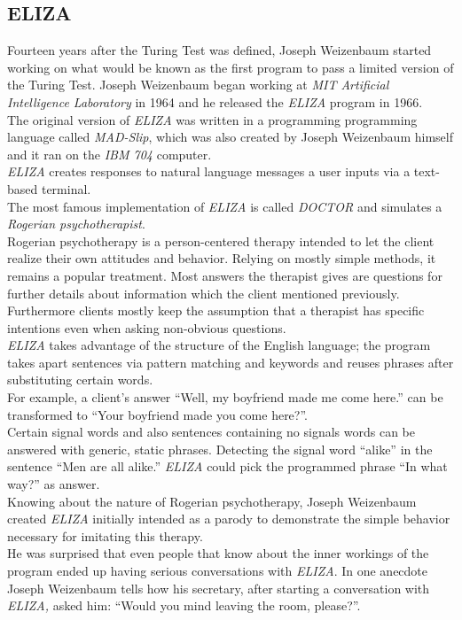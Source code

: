 \subsection{ELIZA}
\label{eliza}

Fourteen years after the Turing Test was defined, Joseph Weizenbaum started working on what would be known as the first program to pass a limited version of the Turing Test.
Joseph Weizenbaum began working at \emph{MIT Artificial Intelligence Laboratory} in 1964 and he released the \emph{ELIZA} program in 1966.
\\

The original version of \emph{ELIZA} was written in a programming programming language called \emph{MAD-Slip},
which was also created by Joseph Weizenbaum himself and it ran on the \emph{IBM 704} computer.
\\
\emph{ELIZA} creates responses to natural language messages a user inputs via a text-based terminal.
\\

The most famous implementation of \emph{ELIZA} is called \emph{DOCTOR} and simulates a \emph{Rogerian psychotherapist}.
\\
Rogerian psychotherapy is a person-centered therapy intended to let the client realize their own attitudes and behavior.
Relying on mostly simple methods, it remains a popular treatment.
Most answers the therapist gives are questions for further details about information which the client mentioned previously.
Furthermore clients mostly keep the assumption that a therapist has specific intentions even when asking non-obvious questions.
\\

\emph{ELIZA} takes advantage of the structure of the English language;
the program takes apart sentences via pattern matching and keywords and reuses phrases after substituting certain words.
\\
For example, a client's answer ``Well, my boyfriend made me come here.'' can be transformed to ``Your boyfriend made you come here?''\cite{elizatest}.
\\
Certain signal words and also sentences containing no signals words can be answered with generic, static phrases.
Detecting the signal word ``alike'' in the sentence ``Men are all alike.'' \emph{ELIZA} could pick the programmed phrase ``In what way?'' as answer\cite{elizatest}.
\\

Knowing about the nature of Rogerian psychotherapy, Joseph Weizenbaum created \emph{ELIZA} initially intended as a parody to demonstrate the simple behavior necessary for imitating this therapy.
\\
He was surprised that even people that know about the inner workings of the program ended up having serious conversations with \emph{ELIZA}.
In one anecdote Joseph Weizenbaum tells how his secretary, after starting a conversation with \emph{ELIZA,} asked him: ``Would you mind leaving the room, please?''\cite[5]{weizenbaum}.
\\

